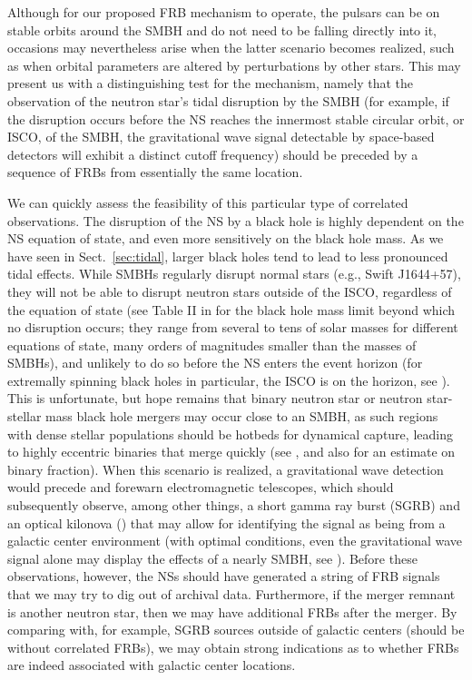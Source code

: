 \documentclass{aa}
\begin{document}
Although for our proposed FRB mechanism to operate, the pulsars can be on stable orbits around the SMBH and do not need to be falling directly into it, occasions may nevertheless arise when the latter scenario becomes realized, such as when orbital parameters are altered by perturbations by other stars. This may present us with a distinguishing test for the mechanism, namely that the observation of the neutron star's tidal disruption by the SMBH (for example, if the disruption occurs before the NS reaches the innermost stable circular orbit, or ISCO, of the SMBH, the gravitational wave signal detectable by space-based detectors will exhibit a distinct cutoff frequency) should be preceded by a sequence of FRBs from essentially the same location. 

We can quickly assess the feasibility of this particular type of correlated observations. The disruption of the NS by a black hole is highly dependent on the NS equation of state, and even more sensitively on the black hole mass. As we have seen in Sect.~\ref{sec:tidal}, larger black holes tend to lead to less pronounced tidal effects. While SMBHs regularly disrupt normal stars (e.g., Swift J1644+57), they will not be able to disrupt neutron stars outside of the ISCO, regardless of the equation of state (see Table II in \cite{2010PhRvD..81f4026F} for the black hole mass limit beyond which no disruption occurs; they range from several to tens of solar masses for different equations of state, many orders of magnitudes smaller than the masses of SMBHs), and unlikely to do so before the NS enters the event horizon (for extremally spinning black holes in particular, the ISCO is on the horizon, see \cite{ted}). This is unfortunate, but hope remains that binary neutron star or neutron star-stellar mass black hole mergers may occur close to an SMBH, as such regions with dense stellar populations should be hotbeds for dynamical capture, leading to highly eccentric binaries that merge quickly (see \cite{O'Leary:2008xt,Antonini:2012ad}, and also \cite{2009ApJ...700.1933H} for an estimate on binary fraction). When this scenario is realized, a gravitational wave detection would precede and forewarn electromagnetic telescopes, which should subsequently observe, among other things, a short gamma ray burst (SGRB) and an optical kilonova (\cite{metzger:11}) that may allow for identifying the signal as being from a galactic center environment 
(with optimal conditions, even the gravitational wave signal alone may display the effects of a nearly SMBH, see \cite{2012PhRvD..86f4030Z}). Before these observations, however, the NSs should have generated a string of FRB signals that we may try to dig out of archival data. Furthermore, if the merger remnant is another neutron star, then we may have additional FRBs after the merger. By comparing with, for example, SGRB sources outside of galactic centers (should be without correlated FRBs), we may obtain strong indications as to whether FRBs are indeed associated with galactic center locations.
\end{document}
